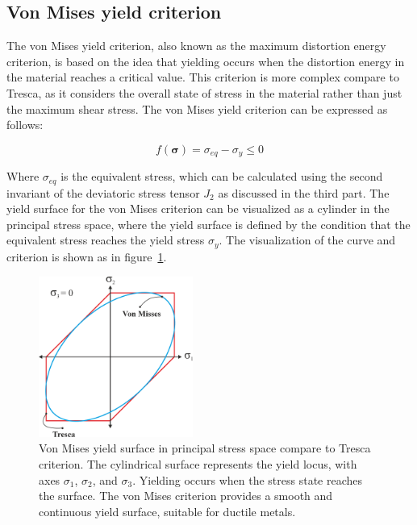 \documentclass[12pt]{article}
\begin{document}
\subsection{Von Mises yield criterion}

\hspace{2em}The von Mises yield criterion, also known as the maximum distortion energy criterion, is based on the idea
that yielding occurs when the distortion energy in the material reaches a critical value. This criterion is 
more complex compare to Tresca, as it considers the overall state of stress in the material rather than just
the maximum shear stress. The von Mises yield criterion can be expressed as follows:

\begin{equation}
    f(\boldsymbol{\sigma}) = \sigma_{eq} - \sigma_y \leq 0
\end{equation}

Where $\sigma_{eq}$ is the equivalent stress, which can be calculated using the second invariant of the deviatoric stress tensor $J_2$ as discussed in the third part.
The yield surface for the von Mises criterion can be visualized as a cylinder in the principal stress space, 
where the yield surface is defined by the condition that the equivalent stress reaches the yield stress 
$\sigma_y$. The visualization of the curve and criterion is shown as in figure~\ref{fig:vonmises_surface}.

\begin{figure}[H]
    \centering
    \includegraphics[width=0.45\textwidth]{images/VonMises.png}
    \caption{Von Mises yield surface in principal stress space compare to Tresca criterion. 
    The cylindrical surface represents the yield locus, with axes $\sigma_1$, $\sigma_2$, and $\sigma_3$. 
    Yielding occurs when the stress state reaches the surface. 
    The von Mises criterion provides a smooth and continuous yield surface, suitable for ductile metals.\cite{hosford2005}}
    \label{fig:vonmises_surface}
\end{figure}
\end{document}
